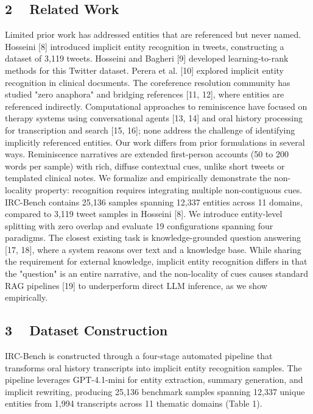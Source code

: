 \documentclass[
]{article}
\newcounter{none} %
\begin{document}
\subsection{2 ~ Related Work}\label{related-work}

Limited prior work has addressed entities that are referenced but never
named. Hosseini {[}8{]} introduced implicit entity recognition in
tweets, constructing a dataset of 3,119 tweets. Hosseini and Bagheri
{[}9{]} developed learning-to-rank methods for this Twitter dataset.
Perera et al. {[}10{]} explored implicit entity recognition in clinical
documents. The coreference resolution community has studied "zero
anaphora" and bridging references {[}11, 12{]}, where entities are
referenced indirectly. Computational approaches to reminiscence have
focused on therapy systems using conversational agents {[}13, 14{]} and
oral history processing for transcription and search {[}15, 16{]}; none
address the challenge of identifying implicitly referenced entities. Our
work differs from prior formulations in several ways. Reminiscence
narratives are extended first-person accounts (50 to 200 words per
sample) with rich, diffuse contextual cues, unlike short tweets or
templated clinical notes. We formalize and empirically demonstrate the
non-locality property: recognition requires integrating multiple
non-contiguous cues. IRC-Bench contains 25,136 samples spanning 12,337
entities across 11 domains, compared to 3,119 tweet samples in Hosseini
{[}8{]}. We introduce entity-level splitting with zero overlap and
evaluate 19 configurations spanning four paradigms. The closest existing
task is knowledge-grounded question answering {[}17, 18{]}, where a
system reasons over text and a knowledge base. While sharing the
requirement for external knowledge, implicit entity recognition differs
in that the "question" is an entire narrative, and the non-locality of
cues causes standard RAG pipelines {[}19{]} to underperform direct LLM
inference, as we show empirically.

\subsection{3 ~ Dataset Construction}\label{dataset-construction}

IRC-Bench is constructed through a four-stage automated pipeline that
transforms oral history transcripts into implicit entity recognition
samples. The pipeline leverages GPT-4.1-mini for entity extraction,
summary generation, and implicit rewriting, producing 25,136 benchmark
samples spanning 12,337 unique entities from 1,994 transcripts across 11
thematic domains (Table 1).
\end{document}

